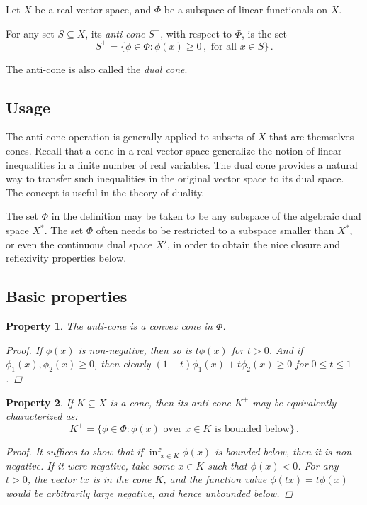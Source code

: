 \documentclass[12pt]{article}
\newtheorem{prop}{Property}
\newcommand{\defnterm}[1]{\emph{#1}}
\begin{document}
Let $X$ be a real vector space, and $\Phi$ be a subspace of linear functionals
on $X$.

For any set $S \subseteq X$, 
its \defnterm{anti-cone} $S^+$,
with respect to $\Phi$, is the set
\[
S^+ = \{ \phi \in \Phi \colon \phi(x) \geq 0 \,, \text{ for all } x \in S \}\,.
\]

The anti-cone is also called the \emph{dual cone}.

\subsection*{Usage}

The anti-cone operation is generally applied to subsets of $X$
that are themselves
cones.
Recall that a cone in a real vector space generalize the notion of
linear inequalities in a finite number of real variables.
The dual cone provides a natural way to transfer such
inequalities in the original vector space
to its dual space.
The concept is useful in the theory of 
duality.

The set $\Phi$ in the definition may be taken to be any subspace
of the algebraic dual space $X^*$.
The set $\Phi$ often needs to be restricted
to a subspace smaller than $X^*$, or even 
the continuous dual space $X'$,
in order to obtain 
the nice closure and reflexivity properties below.

\subsection*{Basic properties}

\begin{prop}\label{prop:is-cone}
The anti-cone is a convex cone in $\Phi$. 
\begin{proof}
If $\phi(x)$ is non-negative, then so is $t\phi(x)$ for $t > 0$.
And if $\phi_1(x), \phi_2(x) \geq 0$,
then clearly $(1-t)\phi_1(x) + t\phi_2(x) \geq 0$ for $0 \leq t \leq 1$.
\end{proof}
\end{prop}

\begin{prop}\label{prop:lower-bound}
If $K \subseteq X$ is a cone, then its anti-cone $K^+$ may be equivalently 
characterized as:
\[
K^+ = \{ \phi \in \Phi \colon 
\text{$\phi(x)$ over $x \in K$ is bounded below} \}\,.
\]
\begin{proof}
It suffices to show that if $\inf_{x \in K} \phi(x)$ is bounded below, 
then it is non-negative.
If it were negative, take some $x \in K$ such that
$\phi(x) < 0$.  For any $t > 0$, the vector $tx$ is in the cone $K$,
and the function value $\phi(tx) = t\phi(x)$ would be arbitrarily
large negative, and hence unbounded below.
\end{proof}
\end{prop}
\end{document}

